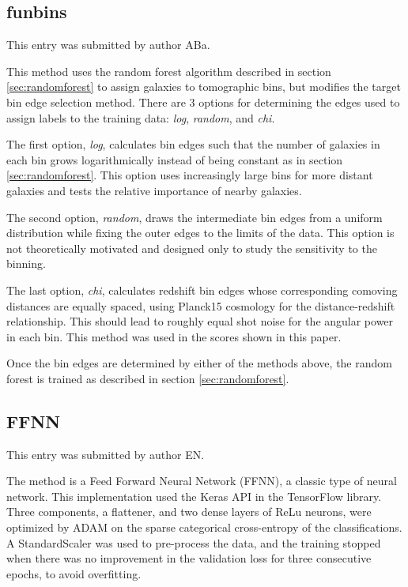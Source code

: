 \documentclass[twocolumn,twocolappendix]{aastex63}
\begin{document}
\subsection{ {\sc funbins} } \label{sec:funbins}
This entry was submitted by author ABa.

This method uses the random forest algorithm described in section \ref{sec:randomforest} to assign galaxies to tomographic bins, but modifies the target bin edge selection method. There are 3 options for determining the edges used to assign labels to the training data: \textit{log}, \textit{random}, and \textit{chi}. 

The first option, \textit{log}, calculates bin edges such that the number of galaxies in each bin grows logarithmically instead of being constant as in section \ref{sec:randomforest}. This option uses increasingly large bins for more distant galaxies and tests the relative importance of nearby galaxies.

The second option, \textit{random}, draws the intermediate bin edges from a uniform distribution while fixing the outer edges to the limits of the data. This option is not theoretically motivated and designed only to study the sensitivity to the binning. 

The last option, \textit{chi}, calculates redshift bin edges whose corresponding comoving distances are equally spaced, using Planck15 \citep{Planck15} cosmology for the distance-redshift relationship. This should lead to roughly equal shot noise for the angular power in each bin. 
This method was used in the scores shown in this paper.

Once the bin edges are determined by either of the methods above, the random forest is trained as described in section \ref{sec:randomforest}.

\subsection{FFNN}
This entry was submitted by author EN.

The method is a Feed Forward Neural Network (FFNN), a classic type of neural network.
This implementation used the Keras API in the TensorFlow library. Three components, a flattener, and two 
dense layers of ReLu neurons, were optimized by ADAM on the sparse categorical cross-entropy of the classifications.
A StandardScaler was used to pre-process the data, and the training stopped when there was no improvement in the  
validation loss for three consecutive epochs, to avoid overfitting.
\end{document}
